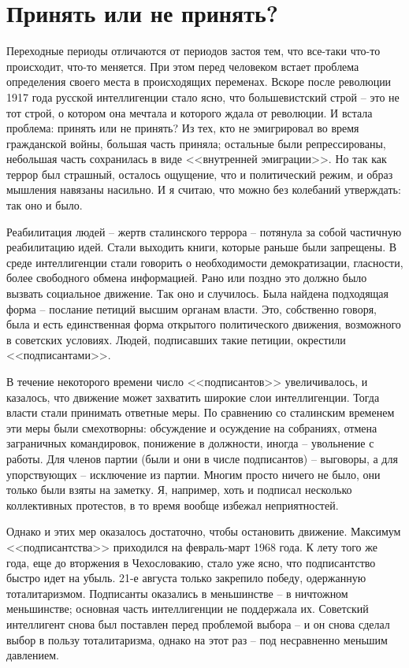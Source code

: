 \documentclass{book}
\begin{document}
\section{Принять или не принять?}

Переходные периоды отличаются от периодов застоя тем, что все-таки что-то происходит, что-то меняется. При этом перед человеком встает проблема определения своего места в происходящих переменах. Вскоре после революции 1917 го­да русской интеллигенции стало ясно, что большевистский строй -- это не тот строй, о котором она мечтала и которого ждала от революции. И встала проблема: принять или не при­нять? Из тех, кто не эмигрировал во время гражданской вой­ны, большая часть приняла; остальные были репрессированы, небольшая часть сохранилась в виде <<внутренней эмиграции>>. Но так как террор был страшный, осталось ощущение, что и политический режим, и образ мышления навязаны насильно. И я считаю, что можно без колебаний утверждать: так оно и было.

Реабилитация людей -- жертв сталинского террора -- потя­нула за собой частичную реабилитацию идей. Стали выходить книги, которые раньше были запрещены. В среде интеллиген­ции стали говорить о необходимости демократизации, глас­ности, более свободного обмена информацией. Рано или позд­но это должно было вызвать социальное движение. Так оно и случилось. Была найдена подходящая форма -- послание петиций высшим органам власти. Это, собственно говоря, была и есть единственная форма открытого политического движения, возможного в советских условиях. Людей, подписавших такие петиции, окрестили <<подписантами>>.

В течение некоторого времени число <<подписантов>> увели­чивалось, и казалось, что движение может захватить широкие слои интеллигенции. Тогда власти стали принимать ответные меры. По сравнению со сталинским временем эти меры были смехотворны: обсуждение и осуждение на собраниях, отмена заграничных командировок, понижение в должности, иногда -- увольнение с работы. Для членов партии (были и они в числе подписантов) -- выговоры, а для упорствующих -- исключение из партии. Многим просто ничего не было, они только были взяты на заметку. Я, например, хоть и подписал несколько коллективных протестов, в то время вообще избежал непри­ятностей.

Однако и этих мер оказалось достаточно, чтобы остановить движение. Максимум <<подписантства>> приходился на фев­раль-март 1968 года. К лету того же года, еще до вторжения в Чехословакию, стало уже ясно, что подписантство быстро идет на убыль. 21-е августа только закрепило победу, одер­жанную тоталитаризмом. Подписанты оказались в меньшинст­ве -- в ничтожном меньшинстве; основная часть интеллиген­ции не поддержала их. Советский интеллигент снова был по­ставлен перед проблемой выбора -- и он снова сделал выбор в пользу тоталитаризма, однако на этот раз -- под несравненно меньшим давлением.
\end{document}
